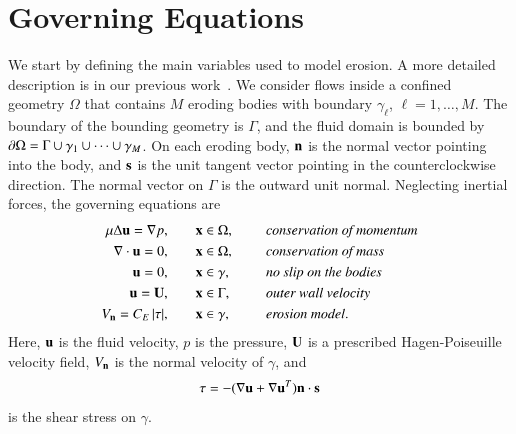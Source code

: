 \documentclass[preprint, 10pt]{elsarticle}
\begin{document}
\section{Governing Equations}
\label{sec:formulation}
We start by defining the main variables used to model erosion.  A more
detailed description is in our previous work~\cite{qua-moo2018}.  We
consider flows inside a confined geometry $\Omega$ that contains $M$
eroding bodies with boundary $\gamma_\ell$, $\ell = 1,\ldots,M$.  The
boundary of the bounding geometry is $\Gamma$, and the fluid domain is
bounded by $\bd \Omega = \Gamma \cup \gamma_1 \cup \cdots \cup
\gamma_M$.  On each eroding body, $\nn$ is the normal vector pointing
into the body, and $\ss$ is the unit tangent vector pointing in the
counterclockwise direction.  The normal vector on $\Gamma$ is the
outward unit normal.  Neglecting inertial forces, the governing
equations are
\begin{equation}
\label{eqn:erosionModel}
  \begin{split}
    \mu \Delta \uu = \grad p, &\hspace{20pt} \xx \in \Omega, \gap 
      &&\mbox{\em conservation of momentum}\\
    \grad \cdot \uu = 0, &\hspace{20pt} \xx \in \Omega, \gap 
      &&\mbox{\em conservation of mass} \\
    \uu = 0, &\hspace{20pt} \xx \in \gamma, \gap 
      &&\mbox{\em no slip on the bodies} \\
    \uu = \UU, &\hspace{20pt} \xx \in \Gamma, \gap 
      &&\mbox{\em outer wall velocity} \\
    \Vn = \CE \, \abs{\tau}, &\hspace{20pt} \xx \in \gamma,
      &&\mbox{\em erosion model}.
  \end{split}
\end{equation}
Here, $\uu$ is the fluid velocity, $p$ is the pressure, $\UU$ is a
prescribed Hagen-Poiseuille velocity field, $\Vn$ is the normal velocity
of $\gamma$, and
\begin{align}
  \tau = -(\nabla \uu + \nabla \uu^T) \nn \cdot \ss
  \label{eqn:shearStress}
\end{align}
is the shear stress on $\gamma$.
\end{document}
